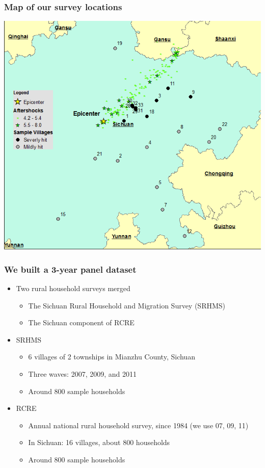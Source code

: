 \documentclass[aspectratio=169]{beamer}
\begin{document}
\begin{frame}
	\frametitle{Map of our survey locations}
	\vspace{0.5cm}
	\includegraphics[scale=0.45]{pics/MapSichuanQuakeForPaper_v2_latest_cropped} \\	
\end{frame}


\begin{frame}
\frametitle{We built a 3-year panel dataset}
	\begin{itemize}
		\item Two rural household surveys merged
		\begin{itemize}
			\item The Sichuan Rural Household and Migration Survey (SRHMS)
			\item The Sichuan component of RCRE
		\end{itemize}
		\item <2-> SRHMS 
		\begin{itemize}
			\item 6 villages of 2 townships in Mianzhu County, Sichuan
			\item Three waves: 2007, 2009, and 2011
			\item Around 800 sample households
		\end{itemize}
		\item <3-> RCRE
		\begin{itemize}
			\item Annual national rural household survey, since 1984 (we use 07, 09, 11)
			\item In Sichuan: 16 villages, about 800 households
			\item Around 800 sample households
		\end{itemize}
	\end{itemize}
\end{frame}
\end{document}

